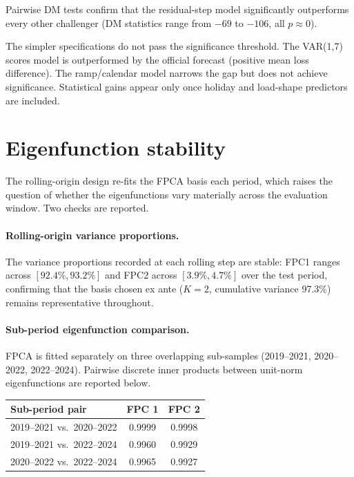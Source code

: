\documentclass[10pt,a4paper]{article}
\begin{document}
Pairwise DM tests confirm that the residual-step model significantly outperforms every other challenger (DM statistics range from \(-69\) to \(-106\), all \(p \approx 0\)).

The simpler specifications do not pass the significance threshold. The VAR(1,7) scores model is outperformed by the official forecast (positive mean loss difference). The ramp/calendar model narrows the gap but does not achieve significance. Statistical gains appear only once holiday and load-shape predictors are included.

\section*{Eigenfunction stability}

The rolling-origin design re-fits the FPCA basis each period, which raises the question of whether the eigenfunctions vary materially across the evaluation window. Two checks are reported.

\paragraph{Rolling-origin variance proportions.}  The variance proportions recorded at each rolling step are stable: FPC1 ranges across \([92.4\%, 93.2\%]\) and FPC2 across \([3.9\%, 4.7\%]\) over the test period, confirming that the basis chosen ex ante (\(K = 2\), cumulative variance 97.3\%) remains representative throughout.

\paragraph{Sub-period eigenfunction comparison.}  FPCA is fitted separately on three overlapping sub-samples (2019--2021, 2020--2022, 2022--2024). Pairwise discrete inner products between unit-norm eigenfunctions are reported below.

\begin{center}
\fontsize{8.2}{9.5}\selectfont
\begin{tabular}{lcc}
\toprule
Sub-period pair & FPC 1 & FPC 2\\
\midrule
2019--2021 vs.\ 2020--2022 & 0.9999 & 0.9998\\
2019--2021 vs.\ 2022--2024 & 0.9960 & 0.9929\\
2020--2022 vs.\ 2022--2024 & 0.9965 & 0.9927\\
\bottomrule
\end{tabular}
\end{center}
\end{document}
